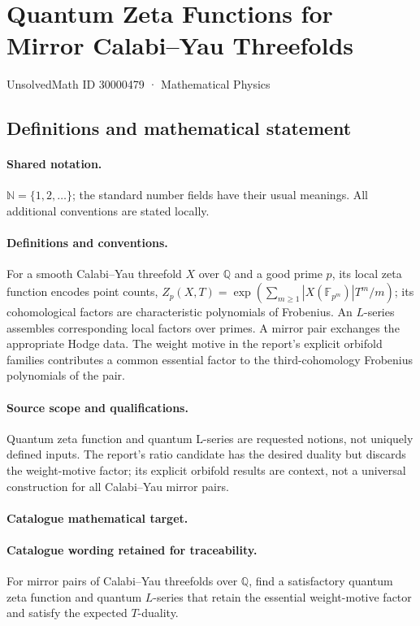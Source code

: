\documentclass[11pt]{article}
\begin{document}
\setcounter{section}{30000478}
\section{Quantum Zeta Functions for Mirror Calabi–Yau Threefolds}\label{30000479}
{\small UnsolvedMath ID 30000479 · Mathematical Physics}
\subsection{Definitions and mathematical statement}

\paragraph{Shared notation.}$\mathbb N=\{1,2,\ldots\}$; the standard number fields have their usual meanings. All additional conventions are stated locally.


\paragraph{Definitions and conventions.} For a smooth Calabi--Yau threefold $X$ over $\mathbb Q$ and a good prime $p$, its local zeta function encodes point counts, $Z_p(X,T)=\exp(\sum_{m\ge1}|X(\mathbb F_{p^m})|T^m/m)$; its cohomological factors are characteristic polynomials of Frobenius. An $L$-series assembles corresponding local factors over primes. A mirror pair exchanges the appropriate Hodge data. The weight motive in the report's explicit orbifold families contributes a common essential factor to the third-cohomology Frobenius polynomials of the pair.

\paragraph{Source scope and qualifications.} Quantum zeta function and quantum L-series are requested notions, not uniquely defined inputs. The report's ratio candidate has the desired duality but discards the weight-motive factor; its explicit orbifold results are context, not a universal construction for all Calabi--Yau mirror pairs.

\paragraph{Catalogue mathematical target.}
\paragraph{Catalogue wording retained for traceability.}
For mirror pairs of Calabi–Yau threefolds over $\mathbb Q$, find a satisfactory quantum zeta function and quantum $L$-series that retain the essential weight-motive factor and satisfy the expected $T$-duality.
\end{document}
